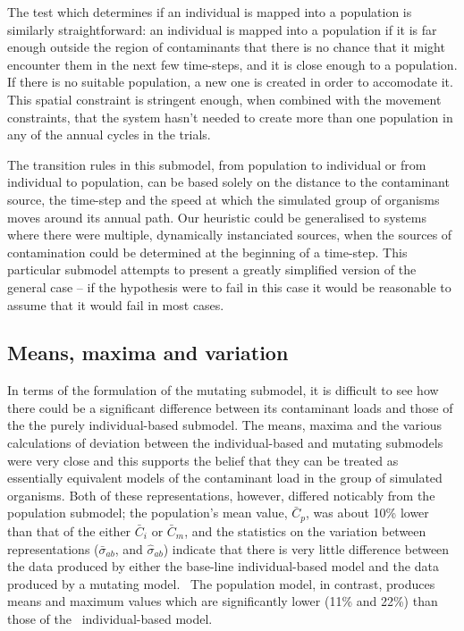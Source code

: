 \documentclass[preprint,authoryear,5p,twocolumn]{elsarticle}
\begin{document}
The test which determines if an individual is mapped into a population is similarly straightforward: an individual is
mapped into a population if it is far enough outside the region of contaminants that there is no chance that it might
encounter them in the next few time-steps, and it is close enough to a population. If there is no suitable population,
a new one is created in order to accomodate it. This spatial constraint is stringent enough, when combined with the
movement constraints, that the system hasn't needed to create more than one population in any of the annual cycles in
the trials.

The transition rules in this submodel, from population to individual or from individual to population, can be based
solely on the distance to the contaminant source, the time-step and the speed at which the simulated group of organisms
moves around its annual path. Our heuristic could be generalised to systems where there were multiple, dynamically
instanciated sources, when the sources of contamination could be determined at the beginning of a time-step. This
particular submodel attempts to present a greatly simplified version of the general case -- if the hypothesis were to
fail in this case it would be reasonable to assume that it would fail in most cases.

\subsection{Means, maxima and variation}

In terms of the formulation of the mutating submodel, it is difficult to see how there could be a significant
difference between its contaminant loads and those of the the purely individual-based submodel. The means, maxima and
the various calculations of deviation between the individual-based and mutating submodels were very close and this
supports the belief that they can be treated as essentially equivalent models of the contaminant load in the group of
simulated organisms. Both of these representations, however, differed noticably from the population submodel; the
population's mean value, $\bar{C}_p$, was about 10\% lower than that of the either $\bar{C}_i$ or $\bar{C}_m$, and the
statistics on the variation between representations ($\bar{\sigma}_{a b}$, and $\hat{\sigma}_{a b}$) indicate that
there is very little difference between the data produced by either the base-line individual-based model and the data
produced by a mutating model. \ The population model, in contrast, produces means and maximum values which are
significantly lower (11\% and 22\%) than those of the \ individual-based model.
\end{document}
